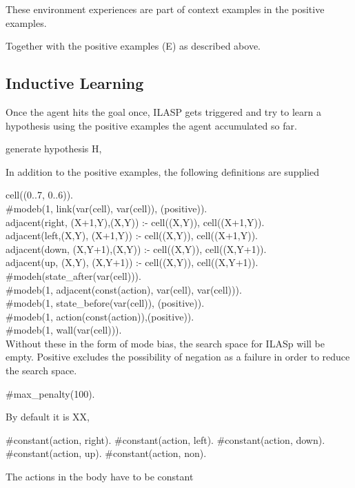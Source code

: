 These environment experiences are part of context examples in the positive examples. 

Together with the positive examples (E) as described above. 

\subsection{Inductive Learning}
\label{induction}

Once the agent hits the goal once, ILASP gets triggered and try to learn a hypothesis using the positive examples the agent accumulated so far. 

generate hypothesis H,

In addition to the positive examples, the following definitions are supplied

cell((0..7, 0..6)). \\
\#modeb(1, link(var(cell), var(cell)), (positive)). \\
adjacent(right, (X+1,Y),(X,Y))   :- cell((X,Y)), cell((X+1,Y)). \\
adjacent(left,(X,Y),  (X+1,Y)) :- cell((X,Y)), cell((X+1,Y)). \\
adjacent(down, (X,Y+1),(X,Y))   :- cell((X,Y)), cell((X,Y+1)). \\
adjacent(up,   (X,Y),  (X,Y+1)) :- cell((X,Y)), cell((X,Y+1)). \\

\#modeh(state\_after(var(cell))). \\
\#modeb(1, adjacent(const(action), var(cell), var(cell))). \\
\#modeb(1, state\_before(var(cell)), (positive)). \\
\#modeb(1, action(const(action)),(positive)). \\
\#modeb(1, wall(var(cell))). \\

Without these in the form of mode bias, the search space for ILASp will be empty. 
Positive excludes the possibility of negation as a failure in order to reduce the search space.

\#max\_penalty(100).

By default it is XX, 

\#constant(action, right).
\#constant(action, left).
\#constant(action, down).
\#constant(action, up).
\#constant(action, non).

The actions in the body have to be constant

